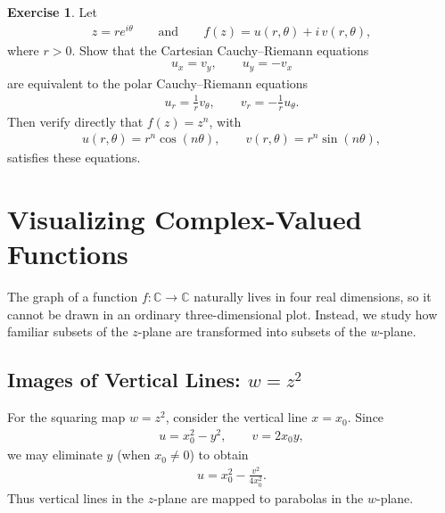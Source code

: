 \documentclass[11pt]{article}
\theoremstyle{plain}
\theoremstyle{definition}
\newtheorem{exercise}[theorem]{Exercise}
\theoremstyle{remark}
\numberwithin{equation}{section}
\newcommand{\be}{\begin{eqnarray}}
\newcommand{\ee}{\end{eqnarray}}
\newcommand{\C}{\mathbb{C}}
\begin{document}
\begin{exercise}
	Let
	\be
	z=re^{i\theta}
	\qquad\text{and}\qquad
	f(z)=u(r,\theta)+i\,v(r,\theta),
	\ee
	where $r>0$.  Show that the Cartesian Cauchy--Riemann equations
	\be
	u_x=v_y,
	\qquad
	u_y=-v_x
	\ee
	are equivalent to the polar Cauchy--Riemann equations
	\be
	\boxed{
		u_r=\frac{1}{r}v_\theta,
		\qquad
		v_r=-\frac{1}{r}u_\theta
	}.
	\ee
	Then verify directly that $f(z)=z^n$, with
	\be
	u(r,\theta)=r^n\cos(n\theta),
	\qquad
	v(r,\theta)=r^n\sin(n\theta),
	\ee
	satisfies these equations.
\end{exercise}

\section{Visualizing Complex-Valued Functions}

The graph of a function $f:\C\to\C$ naturally lives in four real
dimensions, so it cannot be drawn in an ordinary three-dimensional plot.
Instead, we study how familiar subsets of the $z$-plane are transformed
into subsets of the $w$-plane.


\subsection*{Images of Vertical Lines: $w=z^2$}

For the squaring map $w=z^2$, consider the vertical line $x=x_0$.  Since
\be
  u=x_0^2-y^2,
  \qquad
  v=2x_0y,
\ee
we may eliminate $y$ (when $x_0\ne0$) to obtain
\be
  u=x_0^2-\frac{v^2}{4x_0^2}.
\ee
Thus vertical lines in the $z$-plane are mapped to parabolas in the
$w$-plane.

\begin{center}
\end{center}
\end{document}
